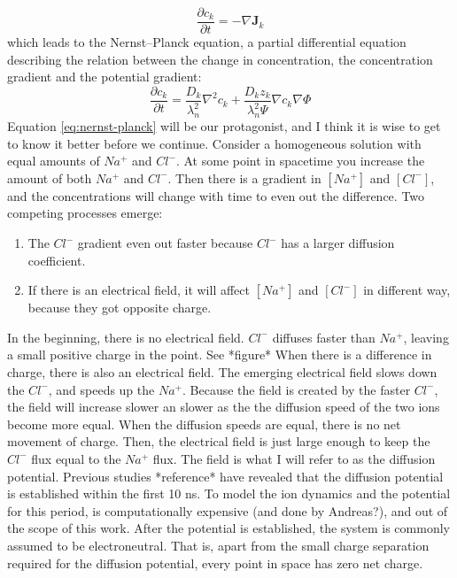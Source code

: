 \documentclass{article}
\begin{document}
\begin{equation}\label{eq:continuity}
\frac{\partial c_k}{\partial t} = -\nabla \bm{J}_k
\end{equation}
which leads to the Nernst--Planck equation, a partial differential equation describing the relation between the change in concentration, the concentration gradient and the potential gradient:
 \begin{equation}\label{eq:nernst-planck}
\frac{\partial c_k}{\partial t}  = \frac{D_k}{\lambda_n^2}\nabla^2 c_k +\frac{D_k z_k}{\lambda_n^2 \Psi}\nabla c_k  \nabla \Phi
\end{equation}
Equation \ref{eq:nernst-planck} will be our protagonist, and I think it is wise to get to know it better before we continue. Consider a homogeneous solution with equal amounts of $Na^+$ and $Cl^-$. At some point in spacetime you increase the amount of both $Na^+$ and $Cl^-$. Then there is a gradient in $[Na^+]$ and $[Cl^-]$, and the concentrations will change with time to even out the difference. Two competing processes emerge:
\begin{enumerate}
\item The $Cl^-$ gradient even out faster because $Cl^-$ has a larger diffusion coefficient. 
\item If there is an electrical field, it will affect  $[Na^+]$ and $[Cl^-]$ in different way, because they got opposite charge.
\end{enumerate}
In the beginning, there is no electrical field. $Cl^-$ diffuses faster than $Na^+$, leaving a small positive charge in the point. See *figure* When there is a difference in charge, there is also an electrical field. The emerging electrical field slows down the $Cl^-$, and speeds up the $Na^+$. Because the field is created by the faster $Cl^-$, the field will increase slower an slower as the  the diffusion speed of the two ions become more equal. When the diffusion speeds are equal, there is no net movement of charge. Then, the electrical field is just large enough to keep the $Cl^-$ flux equal to the $Na^+$ flux. The field is what I will refer to as the diffusion potential. Previous studies *reference* have revealed that the diffusion potential is established within the first 10 ns. To model the ion dynamics and the potential for this period, is computationally expensive (and done by Andreas?), and out of the scope of this work. After the potential is established, the system is commonly assumed to be electroneutral. That is, apart from the small charge separation required for the diffusion potential, every point in space has zero net charge. 
\end{document}
